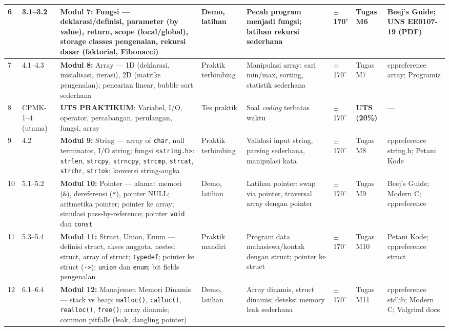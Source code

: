 \documentclass[12pt,a4paper]{article}
\begin{document}
{\begin{landscape}
\begin{longtable}{|p{0.55cm}|p{2.35cm}|p{2.8cm}|p{1.65cm}|p{2.55cm}|p{1.0cm}|p{1.65cm}|p{3.0cm}|}
\hline
6 & 3.1--3.2 & \textbf{Modul 7:} Fungsi --- deklarasi/definisi, parameter (by value), return, scope (local/global), storage classes pengenalan, rekursi dasar (faktorial, Fibonacci) & Demo, latihan & Pecah program menjadi fungsi; latihan rekursi sederhana & $\pm$170' & Tugas M6 & Beej's Guide; UNS EE0107-19 (PDF) \\
\hline
7 & 4.1--4.3 & \textbf{Modul 8:} Array --- 1D (deklarasi, inisialisasi, iterasi), 2D (matriks pengenalan); pencarian linear, bubble sort sederhana & Praktik terbimbing & Manipulasi array: cari min/max, sorting, statistik sederhana & $\pm$170' & Tugas M7 & cppreference array; Programiz \\
\hline
8 & CPMK-1--4 (utama) & \textbf{UTS PRAKTIKUM}: Variabel, I/O, operator, percabangan, perulangan, fungsi, array & Tes praktik & Soal \textit{coding} terbatas waktu & $\pm$170' & \textbf{UTS (20\%)} & --- \\
\hline
9 & 4.2 & \textbf{Modul 9:} String --- array of \texttt{char}, null terminator, I/O string; fungsi \texttt{<string.h>}: \texttt{strlen}, \texttt{strcpy}, \texttt{strncpy}, \texttt{strcmp}, \texttt{strcat}, \texttt{strchr}, \texttt{strtok}; konversi string-angka & Praktik terbimbing & Validasi input string, parsing sederhana, manipulasi kata & $\pm$170' & Tugas M8 & cppreference string.h; Petani Kode \\
\hline
10 & 5.1--5.2 & \textbf{Modul 10:} Pointer --- alamat memori (\texttt{\&}), dereferensi (\texttt{*}), pointer NULL; aritmetika pointer; pointer ke array; simulasi pass-by-reference; pointer \texttt{void} dan \texttt{const} & Demo, latihan & Latihan pointer: swap via pointer, traversal array dengan pointer & $\pm$170' & Tugas M9 & Beej's Guide; Modern C; cppreference \\
\hline
11 & 5.3--5.4 & \textbf{Modul 11:} Struct, Union, Enum --- definisi struct, akses anggota, nested struct, array of struct; \texttt{typedef}; pointer ke struct (\texttt{->}); \texttt{union} dan \texttt{enum}; bit fields pengenalan & Praktik mandiri & Program data mahasiswa/kontak dengan struct; pointer ke struct & $\pm$170' & Tugas M10 & Petani Kode; cppreference struct \\
\hline
12 & 6.1--6.4 & \textbf{Modul 12:} Manajemen Memori Dinamis --- stack vs heap; \texttt{malloc()}, \texttt{calloc()}, \texttt{realloc()}, \texttt{free()}; array dinamis; common pitfalls (leak, dangling pointer) & Demo, latihan & Array dinamis, struct dinamis; deteksi memory leak sederhana & $\pm$170' & Tugas M11 & cppreference stdlib; Modern C; Valgrind docs \\

\end{longtable}
\end{landscape}}
\end{document}
